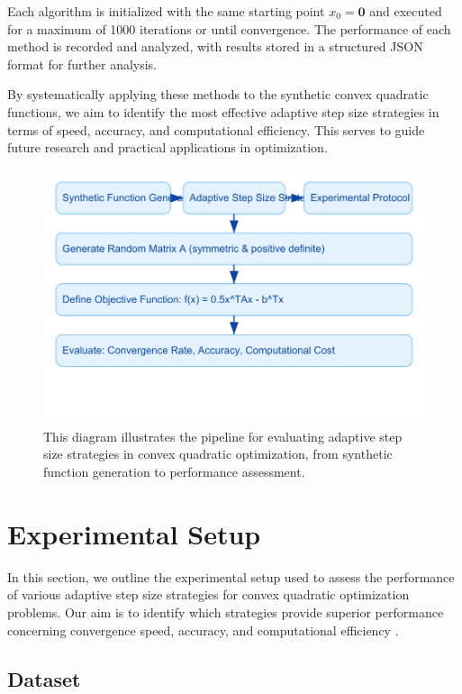 \documentclass[11pt]{article}
\begin{document}
Each algorithm is initialized with the same starting point \( x_0 = \mathbf{0} \) and executed for a maximum of 1000 iterations or until convergence. The performance of each method is recorded and analyzed, with results stored in a structured JSON format for further analysis.

By systematically applying these methods to the synthetic convex quadratic functions, we aim to identify the most effective adaptive step size strategies in terms of speed, accuracy, and computational efficiency. This serves to guide future research and practical applications in optimization.

 \begin{figure}[!htbp]
 \centering
 \includegraphics[width=0.9\linewidth]{diagram_method.pdf}
 \caption{This diagram illustrates the pipeline for evaluating adaptive step size strategies in convex quadratic optimization, from synthetic function generation to performance assessment.}
 \label{fig:method}
 \end{figure}


\section{Experimental Setup}

In this section, we outline the experimental setup used to assess the performance of various adaptive step size strategies for convex quadratic optimization problems. Our aim is to identify which strategies provide superior performance concerning convergence speed, accuracy, and computational efficiency .

\subsection{Dataset}
\end{document}
